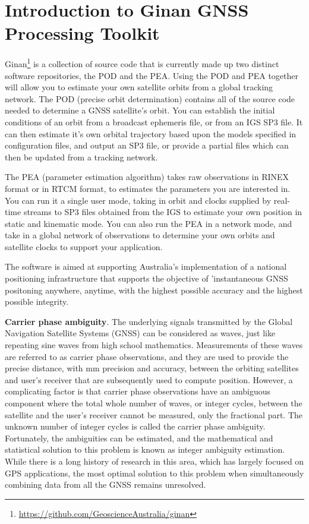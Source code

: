 \chapter{Introduction to Ginan GNSS Processing Toolkit}
\label{ch:introduction}

Ginan\footnote{\url{https://github.com/GeoscienceAustralia/ginan}} is a collection of source code that is currently made up two distinct software repositories, the POD and the PEA.
Using the POD and PEA together will allow you to estimate your own satellite orbits from a global tracking network.
The POD (precise orbit determination) contains all of the source code needed to determine a GNSS satellite's orbit. You can establish the initial conditions of an orbit from a broadcast ephemeris file, or from an IGS SP3 file. It can then estimate it's own orbital trajectory based upon the models specified in configuration files, and output an SP3 file, or provide a partial files which can then be updated from a tracking network. 


The PEA (parameter estimation algorithm) takes raw observations in RINEX format or in RTCM format, to estimates the parameters you are interested in. You can run it a single user mode, taking in orbit and clocks supplied by real-time streams to SP3 files obtained from the IGS to estimate your own position in static and kinematic mode. 
You can also run the PEA in a network mode, and take in a global network of observations to determine your own orbits and satellite clocks to support your application.

The software is aimed at supporting Australia's implementation of a national positioning infrastructure that supports the objective of 'instantaneous GNSS positoning anywhere, anytime, with the highest possible accuracy and the highest possible integrity.

\textbf{Carrier phase ambiguity}. The underlying signals transmitted by the Global Navigation Satellite Systems (GNSS) can be considered as waves, just like repeating sine waves from high school mathematics. Measurements of these waves are referred to as carrier phase observations, and they are used to provide the precise distance, with mm precision and accuracy, between the orbiting satellites and user’s receiver that are subsequently used to compute position. However, a complicating factor is that carrier phase observations have an ambiguous component where the total whole number of waves, or integer cycles, between the satellite and the user’s receiver cannot be measured, only the fractional part. The unknown number of integer cycles is called the carrier phase ambiguity. Fortunately, the ambiguities can be estimated, and the mathematical and statistical solution to this problem is known as integer ambiguity estimation. While there is a long history of research in this area, which has largely focused on GPS applications, the most optimal solution to this problem when simultaneously combining data from all the GNSS remains unresolved.

